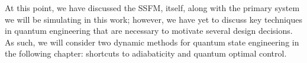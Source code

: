 At this point, we have discussed the SSFM, itself, along with the primary system we will be simulating in this work; however, we have yet to discuss key techniques in quantum engineering that are necessary to motivate several design decisions.
As such, we will consider two dynamic methods for quantum state engineering in the following chapter: shortcuts to adiabaticity and quantum optimal control.
